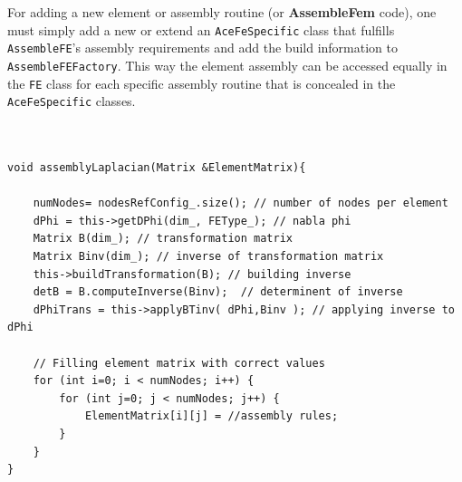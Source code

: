 For adding a new element or assembly routine (or \textbf{AssembleFem} code), one must simply add a new or extend an \texttt{AceFeSpecific} class that fulfills \texttt{AssembleFE}'s assembly  requirements and add the build information to \texttt{AssembleFEFactory}. This way the element assembly can be accessed equally in the \texttt{FE} class for each specific assembly routine that is concealed in the \texttt{AceFeSpecific} classes. 
 ~~\\
 ~~\\
 ~~\\
\begin{lstlisting}
void assemblyLaplacian(Matrix &ElementMatrix){
	
    numNodes= nodesRefConfig_.size(); // number of nodes per element
    dPhi = this->getDPhi(dim_, FEType_); // nabla phi
    Matrix B(dim_); // transformation matrix
    Matrix Binv(dim_); // inverse of transformation matrix
    this->buildTransformation(B); // building inverse
    detB = B.computeInverse(Binv);  // determinent of inverse
    dPhiTrans = this->applyBTinv( dPhi,Binv ); // applying inverse to dPhi
    
    // Filling element matrix with correct values
    for (int i=0; i < numNodes; i++) {
        for (int j=0; j < numNodes; j++) {
            ElementMatrix[i][j] = //assembly rules; 
        }
    }
}
\end{lstlisting}
\label{CodeLaplace}


